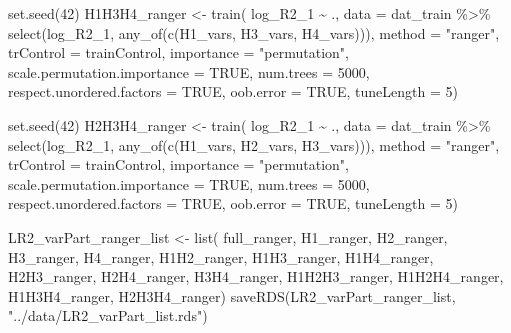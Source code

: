 \documentclass[
  letterpaper,
  DIV=11,
  numbers=noendperiod]{scrreprt}
\newenvironment{Shaded}{\begin{snugshade}}{\end{snugshade}}
\newcommand{\AttributeTok}[1]{\textcolor[rgb]{0.40,0.45,0.13}{#1}}
\newcommand{\ConstantTok}[1]{\textcolor[rgb]{0.56,0.35,0.01}{#1}}
\newcommand{\DecValTok}[1]{\textcolor[rgb]{0.68,0.00,0.00}{#1}}
\newcommand{\FunctionTok}[1]{\textcolor[rgb]{0.28,0.35,0.67}{#1}}
\newcommand{\NormalTok}[1]{\textcolor[rgb]{0.00,0.23,0.31}{#1}}
\newcommand{\OtherTok}[1]{\textcolor[rgb]{0.00,0.23,0.31}{#1}}
\newcommand{\SpecialCharTok}[1]{\textcolor[rgb]{0.37,0.37,0.37}{#1}}
\newcommand{\StringTok}[1]{\textcolor[rgb]{0.13,0.47,0.30}{#1}}
\begin{document}
\begin{Shaded}
\begin{Highlighting}[]
\FunctionTok{set.seed}\NormalTok{(}\DecValTok{42}\NormalTok{)}
\NormalTok{H1H3H4\_ranger }\OtherTok{\textless{}{-}} \FunctionTok{train}\NormalTok{(}
\NormalTok{    log\_R2\_1 }\SpecialCharTok{\textasciitilde{}}\NormalTok{ .,}
    \AttributeTok{data =}\NormalTok{ dat\_train }\SpecialCharTok{\%\textgreater{}\%} \FunctionTok{select}\NormalTok{(log\_R2\_1, }\FunctionTok{any\_of}\NormalTok{(}\FunctionTok{c}\NormalTok{(H1\_vars, H3\_vars, H4\_vars))),}
    \AttributeTok{method =} \StringTok{"ranger"}\NormalTok{,}
    \AttributeTok{trControl =}\NormalTok{ trainControl,}
    \AttributeTok{importance =} \StringTok{"permutation"}\NormalTok{,}
    \AttributeTok{scale.permutation.importance =} \ConstantTok{TRUE}\NormalTok{,}
    \AttributeTok{num.trees =} \DecValTok{5000}\NormalTok{,}
    \AttributeTok{respect.unordered.factors =} \ConstantTok{TRUE}\NormalTok{,}
    \AttributeTok{oob.error =} \ConstantTok{TRUE}\NormalTok{,}
    \AttributeTok{tuneLength =} \DecValTok{5}\NormalTok{)}

\FunctionTok{set.seed}\NormalTok{(}\DecValTok{42}\NormalTok{)}
\NormalTok{H2H3H4\_ranger }\OtherTok{\textless{}{-}} \FunctionTok{train}\NormalTok{(}
\NormalTok{    log\_R2\_1 }\SpecialCharTok{\textasciitilde{}}\NormalTok{ .,}
    \AttributeTok{data =}\NormalTok{ dat\_train }\SpecialCharTok{\%\textgreater{}\%} \FunctionTok{select}\NormalTok{(log\_R2\_1, }\FunctionTok{any\_of}\NormalTok{(}\FunctionTok{c}\NormalTok{(H1\_vars, H2\_vars, H3\_vars))),}
    \AttributeTok{method =} \StringTok{"ranger"}\NormalTok{,}
    \AttributeTok{trControl =}\NormalTok{ trainControl,}
    \AttributeTok{importance =} \StringTok{"permutation"}\NormalTok{,}
    \AttributeTok{scale.permutation.importance =} \ConstantTok{TRUE}\NormalTok{,}
    \AttributeTok{num.trees =} \DecValTok{5000}\NormalTok{,}
    \AttributeTok{respect.unordered.factors =} \ConstantTok{TRUE}\NormalTok{,}
    \AttributeTok{oob.error =} \ConstantTok{TRUE}\NormalTok{,}
    \AttributeTok{tuneLength =} \DecValTok{5}\NormalTok{)}

\NormalTok{LR2\_varPart\_ranger\_list }\OtherTok{\textless{}{-}} \FunctionTok{list}\NormalTok{(}
\NormalTok{    full\_ranger, H1\_ranger, H2\_ranger, H3\_ranger, H4\_ranger, }
\NormalTok{    H1H2\_ranger, H1H3\_ranger, H1H4\_ranger, }
\NormalTok{    H2H3\_ranger, H2H4\_ranger, }
\NormalTok{    H3H4\_ranger, }
\NormalTok{    H1H2H3\_ranger, H1H2H4\_ranger, H1H3H4\_ranger, }
\NormalTok{    H2H3H4\_ranger)}
\FunctionTok{saveRDS}\NormalTok{(LR2\_varPart\_ranger\_list, }\StringTok{"../data/LR2\_varPart\_list.rds"}\NormalTok{)}
\end{Highlighting}
\end{Shaded}
\end{document}
